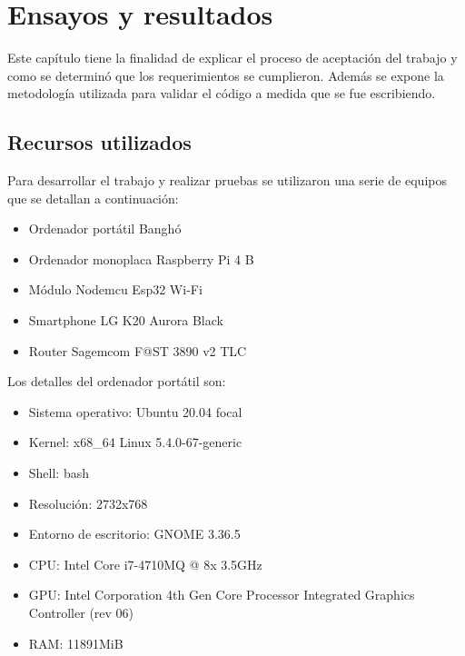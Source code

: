 
\chapter{Ensayos y resultados} %

\label{Chapter4} %


Este capítulo tiene la finalidad de explicar el proceso de aceptación del trabajo y como se determinó que los requerimientos se cumplieron. Además se expone la metodología utilizada para validar el código a medida que se fue escribiendo.

\section{Recursos utilizados}

Para desarrollar el trabajo y realizar pruebas se utilizaron una serie de equipos que se detallan a continuación:

\begin{itemize}
	\item Ordenador portátil Banghó
	\item Ordenador monoplaca Raspberry Pi 4 B
	\item Módulo Nodemcu Esp32 Wi-Fi
	\item Smartphone LG K20 Aurora Black
	\item Router Sagemcom F@ST 3890 v2 TLC
\end{itemize}

Los detalles del ordenador portátil son:
\begin{itemize}
	\item Sistema operativo: Ubuntu 20.04 focal
	\item Kernel: x68\_64 Linux 5.4.0-67-generic
	\item Shell: bash
	\item Resolución: 2732x768
	\item Entorno de escritorio: GNOME 3.36.5
	\item CPU: Intel Core i7-4710MQ @ 8x 3.5GHz
	\item GPU: Intel Corporation 4th Gen Core Processor Integrated Graphics Controller (rev 06)
	\item RAM: 11891MiB
\end{itemize}

